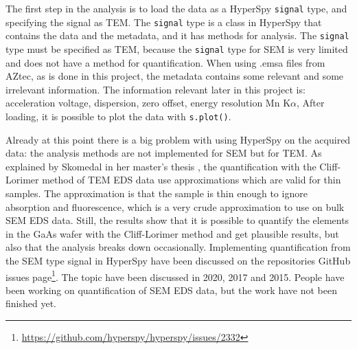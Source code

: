 The first step in the analysis is to load the data as a HyperSpy \verb|signal| type, and specifying the signal as TEM.
The \verb|signal| type is a class in HyperSpy that contains the data and the metadata, and it has methods for analysis.
The \verb|signal| type must be specified as TEM, because the \verb|signal| type for SEM is very limited and does not have a method for quantification.
When using .emsa files from AZtec, as is done in this project, the metadata contains some relevant and some irrelevant information.
The information relevant later in this project is:
acceleration voltage, dispersion, zero offset, energy resolution Mn K$\alpha$,
After loading, it is possible to plot the data with \verb|s.plot()|.

Already at this point there is a big problem with using HyperSpy on the acquired data: the analysis methods are not implemented for SEM but for TEM.
As explained by Skomedal in her master's thesis \cite{skomedal_improving_2022}, the quantification with the Cliff-Lorimer method of TEM EDS data use approximations which are valid for thin samples.
The approximation is that the sample is thin enough to ignore absorption and fluorescence, which is a very crude approximation to use on bulk SEM EDS data.
Still, the results show that it is possible to quantify the elements in the GaAs wafer with the Cliff-Lorimer method and get plausible results, but also that the analysis breaks down occasionally. %
Implementing quantification from the SEM type signal in HyperSpy have been discussed on the repositories GitHub issues page\footnote{\url{https://github.com/hyperspy/hyperspy/issues/2332}}.
The topic have been discussed in 2020, 2017 and 2015.
People have been working on quantification of SEM EDS data, but the work have not been finished yet.

